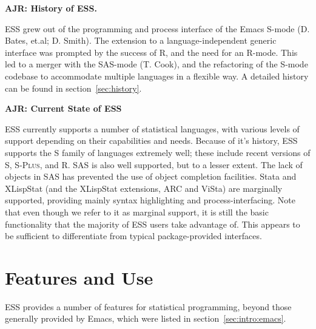 \documentclass{article}
\newcommand*{\Splus}{\textsc{S-Plus}}
\begin{document}
\textbf{AJR: History of ESS.}

ESS grew out of the programming and process interface of the Emacs
S-mode (D. Bates, et.al; D. Smith).  The extension to a
language-independent generic interface was prompted by the success of
R, and the need for an R-mode.  This led to a merger with the SAS-mode
(T. Cook), and the refactoring of the S-mode codebase to accommodate
multiple languages in a flexible way.  A detailed  history can be
found in section~\ref{sec:history}.

\textbf{AJR: Current State of ESS}

ESS currently supports a number of statistical languages, with various
levels of support depending on their capabilities and needs.  Because
of it's history, ESS supports the S family of languages extremely
well; these include recent versions of S, \Splus, and R.  SAS is also
well supported, but to a lesser extent.  The lack of objects in SAS
has prevented the use of object completion facilities.  Stata and
XLispStat (and the XLispStat extensions, ARC and ViSta) are marginally
supported, providing mainly syntax highlighting and
process-interfacing.  Note that even though we refer to it as marginal
support, it is still the basic functionality that the majority of ESS
users take advantage of.  This appears to be sufficient to
differentiate from typical package-provided interfaces.

\section{Features and Use}
\label{sec:basic}


ESS provides a number of features for statistical programming, beyond
those generally provided by Emacs, which were listed in
section~\ref{sec:intro:emacs}.
\end{document}

